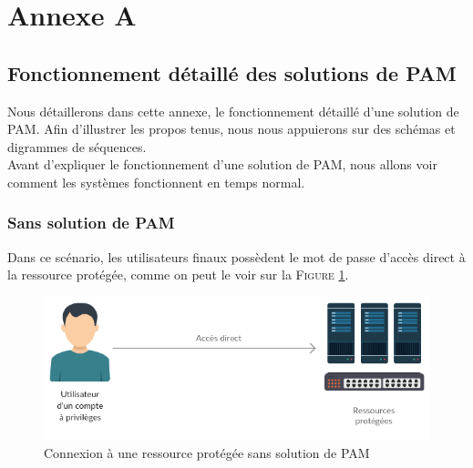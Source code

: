\section*{Annexe A}

\subsection{Fonctionnement détaillé des solutions de PAM}

Nous détaillerons dans cette annexe, le fonctionnement détaillé d'une solution de PAM. Afin d'illustrer les propos tenus, nous nous appuierons sur des schémas et digrammes de séquences.\\
Avant d'expliquer le fonctionnement d'une solution de PAM, nous allons voir comment les systèmes fonctionnent en temps normal.

\subsubsection{Sans solution de PAM}
\label{par:nopam}

Dans ce scénario, les utilisateurs finaux possèdent le mot de passe d'accès direct à la ressource protégée, comme on peut le voir sur la \textsc{Figure} \ref{fig:sans_PAM}.

\begin{figure}[!ht]
    \center
    \includegraphics[width=\textwidth]{./images/Schema_ultra_light_sans_PAM.png}
    \caption{Connexion à une ressource protégée sans solution de PAM}
    \label{fig:sans_PAM}
\end{figure}

